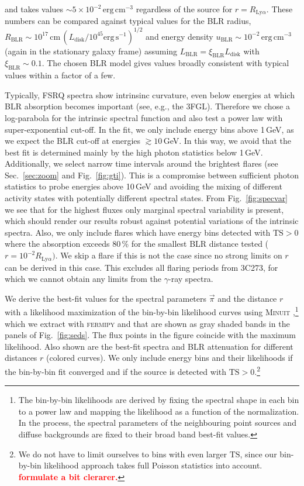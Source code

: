 \documentclass[twocolumn,linenumbers]{aastex62}
\newcommand{\gray}{$\gamma$-ray\xspace}
\newcommand{\todo}[1]{\textbf{\textcolor{red}{#1}}}
\begin{document}
and takes values $\sim 5\times10^{-2}\,\mathrm{erg}\,\mathrm{cm}^{-3}$ regardless of the source for $r = R_{\mathrm{Ly}\alpha}$.
These numbers can be compared against typical values for the BLR radius, $R_\mathrm{BLR} \sim 10^{17}\,\mathrm{cm}\, (L_\mathrm{disk} / 10^{45} \mathrm{erg}\,\mathrm{s}^{-1})^{1/2}$ \citep[e.g.][]{2007ApJ...659..997K,2009ApJ...697..160B} and energy density $u_\mathrm{BLR} \sim 10^{-2}\,\mathrm{erg}\,\mathrm{cm}^{-3} $ (again in the stationary galaxy frame) assuming  $L_\mathrm{BLR} = \xi_\mathrm{BLR} L_\mathrm{disk}$ with $\xi_\mathrm{BLR}\sim 0.1$. 
The chosen BLR model gives values broadly consistent with typical values within a factor of a few.

Typically, FSRQ spectra show intrinsinc curvature, even below energies at which BLR absorption becomes important (see, e.g., the 3FGL). Therefore we chose a log-parabola for the intrinsic spectral function and also test a power law with super-exponential cut-off. 
In the fit, we only include energy bins above 1\,GeV, as we expect the BLR cut-off at energies $\gtrsim 10\,$GeV. In this way, we avoid that the best fit is determined mainly by the high photon statistics below 1\,GeV.
Additionally, we select narrow time intervals around the brightest flares (see Sec.~\ref{sec:zoom} and Fig.~\ref{fig:gti}).
This is a compromise between sufficient photon statistics to probe energies above 10\,GeV and avoiding the mixing of different activity states with potentially different spectral states. 
From Fig.~\ref{fig:specvar} we see that for the highest fluxes only marginal spectral variability is present, which should render our results robust against potential variations of the intrinsic spectra. 
Also, we only include flares which have energy bins detected with $\mathrm{TS} > 0$ where the absorption exceeds 80\,\% for the smallest BLR distance tested ($r = 10^{-2}R_{\mathrm{Ly}\alpha})$. 
We skip a flare if this is not the case since no strong limits on $r$ can be derived in this case.
This excludes all flaring periods from 3C273, for which we cannot obtain any limits from the \gray spectra.

We derive the best-fit values for the spectral parameters $\vec{\pi}$ and the distance $r$ with a likelihood maximization of the bin-by-bin likelihood curves using \textsc{Minuit} \citep{},\footnote{The bin-by-bin likelihoods are derived by fixing the spectral shape in each bin to a power law and mapping the likelihood as a function of the normalization. In the process, the spectral parameters of the neighbouring point sources and diffuse backgrounds are fixed to their broad band best-fit values.} which we extract with \textsc{fermipy} and that are shown as gray shaded bands in the panels of Fig.~\ref{fig:seds}. 
The flux points in the figure coincide with the maximum likelihood. 
Also shown are the best-fit spectra and BLR attenuation for different distances $r$ (colored curves). 
We only include energy bins and their likelihoods if the bin-by-bin fit converged and if the source is detected with $\mathrm{TS} > 0$.\footnote{We do not have to limit ourselves to bins with even larger $\mathrm{TS}$, since our bin-by-bin likelihood approach takes full Poisson statistics into account. \todo{formulate a bit clerarer.}}
\end{document}
